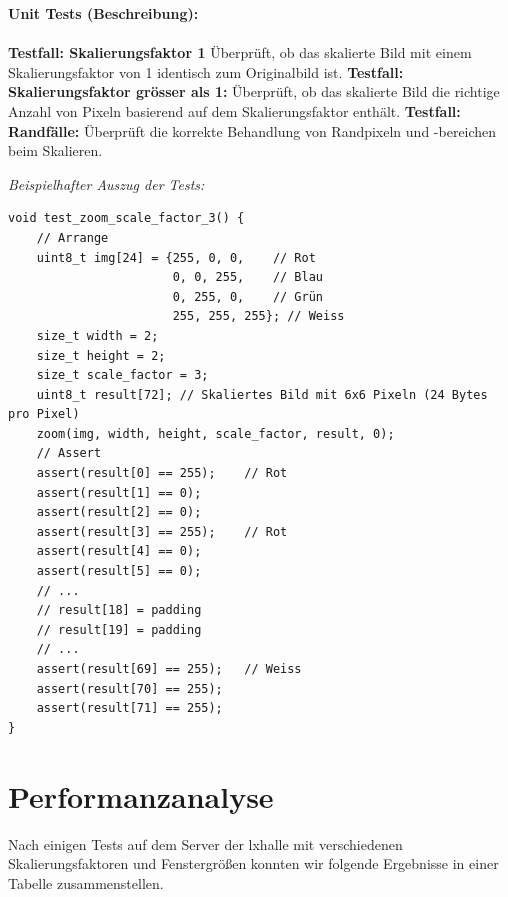 \documentclass[course=erap]{aspdoc}
\begin{document}
\textbf{Unit Tests (Beschreibung):} \\\\
\textbf{Testfall: Skalierungsfaktor 1}\hspace{0.5cm}
Überprüft, ob das skalierte Bild mit einem Skalierungsfaktor von 1 identisch zum Originalbild ist.
\textbf{Testfall: Skalierungsfaktor grösser als 1:}\hspace{0.5cm}
Überprüft, ob das skalierte Bild die richtige Anzahl von Pixeln basierend auf dem Skalierungsfaktor enthält.
\newline \textbf{Testfall: Randfälle:}\hspace{0.5cm}
Überprüft die korrekte Behandlung von Randpixeln und -bereichen beim Skalieren.
\pagebreak

\emph{Beispielhafter Auszug der Tests:}
\begin{lstlisting}
void test_zoom_scale_factor_3() {
    // Arrange
    uint8_t img[24] = {255, 0, 0,    // Rot
                       0, 0, 255,    // Blau
                       0, 255, 0,    // Grün
                       255, 255, 255}; // Weiss
    size_t width = 2;
    size_t height = 2;
    size_t scale_factor = 3;
    uint8_t result[72]; // Skaliertes Bild mit 6x6 Pixeln (24 Bytes pro Pixel)
    zoom(img, width, height, scale_factor, result, 0);
    // Assert
    assert(result[0] == 255);    // Rot
    assert(result[1] == 0);
    assert(result[2] == 0);
    assert(result[3] == 255);    // Rot
    assert(result[4] == 0);
    assert(result[5] == 0);
    // ...
    // result[18] = padding
    // result[19] = padding
    // ...
    assert(result[69] == 255);   // Weiss
    assert(result[70] == 255);
    assert(result[71] == 255);
}
\end{lstlisting}
\section{Performanzanalyse}

Nach einigen Tests auf dem Server der lxhalle mit verschiedenen Skalierungsfaktoren und Fenstergrößen konnten wir folgende Ergebnisse in einer Tabelle zusammenstellen.
\end{document}
